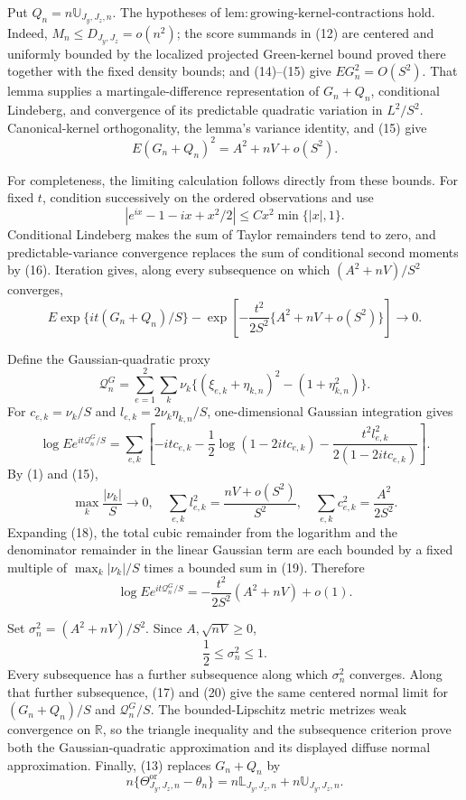 Put \(Q_n=n\mathbb U_{J_y,J_z,n}\). The hypotheses of \(\mathrm{lem{:}growing\text{-}kernel\text{-}contractions}\) hold. Indeed, \(M_n\le D_{J_y,J_z}=o(n^2)\); the score summands in (12) are centered and uniformly bounded by the localized projected Green-kernel bound proved there together with the fixed density bounds; and (14)--(15) give \(EG_n^2=O(S^2)\). That lemma supplies a martingale-difference representation of \(G_n+Q_n\), conditional Lindeberg, and convergence of its predictable quadratic variation in \(L^2/S^2\). Canonical-kernel orthogonality, the lemma's variance identity, and (15) give
\[
E(G_n+Q_n)^2=A^2+nV+o(S^2). \tag{16}
\]

For completeness, the limiting calculation follows directly from these bounds. For fixed \(t\), condition successively on the ordered observations and use
\[
|e^{ix}-1-ix+x^2/2|\le Cx^2\min\{|x|,1\}.
\]
Conditional Lindeberg makes the sum of Taylor remainders tend to zero, and predictable-variance convergence replaces the sum of conditional second moments by (16). Iteration gives, along every subsequence on which \((A^2+nV)/S^2\) converges,
\[
E\exp\{it(G_n+Q_n)/S\}
-\exp\!\left[-\frac{t^2}{2S^2}\{A^2+nV+o(S^2)\}\right]\longrightarrow0. \tag{17}
\]

Define the Gaussian-quadratic proxy
\[
\mathcal Q_n^G=\sum_{e=1}^2\sum_k\nu_k
\{(\xi_{e,k}+\eta_{k,n})^2-(1+\eta_{k,n}^2)\}.
\]
For \(c_{e,k}=\nu_k/S\) and \(l_{e,k}=2\nu_k\eta_{k,n}/S\), one-dimensional Gaussian integration gives
\[
\log Ee^{it\mathcal Q_n^G/S}
=\sum_{e,k}\left[-itc_{e,k}-\frac12\log(1-2itc_{e,k})
-\frac{t^2l_{e,k}^2}{2(1-2itc_{e,k})}\right]. \tag{18}
\]
By (1) and (15),
\[
\max_k\frac{|\nu_k|}{S}\to0,
\quad
\sum_{e,k}l_{e,k}^2=\frac{nV+o(S^2)}{S^2},
\quad
\sum_{e,k}c_{e,k}^2=\frac{A^2}{2S^2}. \tag{19}
\]
Expanding (18), the total cubic remainder from the logarithm and the denominator remainder in the linear Gaussian term are each bounded by a fixed multiple of \(\max_k|\nu_k|/S\) times a bounded sum in (19). Therefore
\[
\log Ee^{it\mathcal Q_n^G/S}
=-\frac{t^2}{2S^2}(A^2+nV)+o(1). \tag{20}
\]

Set \(\sigma_n^2=(A^2+nV)/S^2\). Since \(A,\sqrt{nV}\ge0\),
\[
\frac12\le\sigma_n^2\le1. \tag{21}
\]
Every subsequence has a further subsequence along which \(\sigma_n^2\) converges. Along that further subsequence, (17) and (20) give the same centered normal limit for \((G_n+Q_n)/S\) and \(\mathcal Q_n^G/S\). The bounded-Lipschitz metric metrizes weak convergence on \(\mathbb R\), so the triangle inequality and the subsequence criterion prove both the Gaussian-quadratic approximation and its displayed diffuse normal approximation. Finally, (13) replaces \(G_n+Q_n\) by
\[
n\{\Theta^{\mathrm{or}}_{J_y,J_z,n}-\theta_n\}
=n\mathbb L_{J_y,J_z,n}+n\mathbb U_{J_y,J_z,n}. \tag{22}
\]

